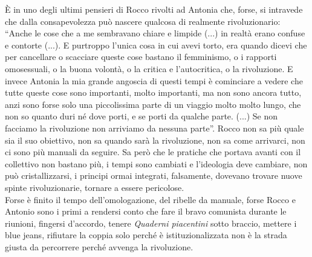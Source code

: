 È in uno degli ultimi pensieri di Rocco rivolti ad Antonia che, forse, si intravede che dalla consapevolezza può nascere qualcosa di realmente rivoluzionario: \enquote{Anche le cose che a me sembravano chiare e limpide (...) in realtà erano confuse e contorte (...). E purtroppo l'unica cosa in cui avevi torto, era quando dicevi che per cancellare o scacciare queste cose bastano il femminismo, o i rapporti omosessuali, o la buona volontà, o la critica e l'autocritica, o la rivoluzione. E invece Antonia la mia grande angoscia di questi tempi è cominciare a vedere che tutte queste cose sono importanti, molto importanti, ma non sono ancora tutto, anzi sono forse solo una piccolissima parte di un viaggio molto molto lungo, che non so quanto duri né dove porti, e se porti da qualche parte. (...) Se non facciamo la rivoluzione non arriviamo da nessuna parte}.
Rocco non sa più quale sia il suo obiettivo, non sa quando sarà la rivoluzione, non sa come arrivarci, non ci sono più manuali da seguire.
Sa però che le pratiche che portava avanti con il collettivo non bastano più, i tempi sono cambiati e l'ideologia deve cambiare, non può cristallizzarsi, i principi ormai integrati, falsamente, dovevano trovare nuove spinte rivoluzionarie, tornare a essere pericolose.
\\Forse è finito il tempo dell'omologazione, del ribelle da manuale, forse Rocco e Antonio sono i primi a rendersi conto che fare il bravo comunista durante le riunioni, fingersi d'accordo, tenere \textit{Quaderni piacentini} sotto braccio, mettere i blue jeans, rifiutare la coppia solo perché è istituzionalizzata non è la strada giusta da percorrere perché avvenga la rivoluzione.

